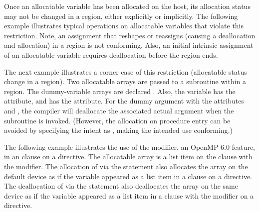 \begin{fortranspecific}[4ex]

Once an allocatable variable has been allocated on the host,
its allocation status may not be changed in a  region, either
explicitly or implicitly. The following example illustrates typical
operations on allocatable variables that violate this restriction.
Note, an assignment that reshapes or reassigns (causing a deallocation
and allocation) in a  region is not conforming.
Also, an initial intrinsic assignment of an allocatable variable 
requires deallocation before the  region ends.


The next example illustrates a corner case of this restriction (allocatable status
change in a  region).
Two allocatable arrays are passed to a subroutine within a 
region. The dummy-variable arrays are declared .
Also, the  variable has the  attribute, and 
has the  attribute. 
For the dummy argument with the attributes  and , 
the compiler will deallocate the associated actual argument when the subroutine is invoked. 
(However, the allocation on procedure entry can be avoided by specifying the intent 
as , making the intended use conforming.)


The following example illustrates the use of the 
modifier, an OpenMP 6.0 feature, in an  clause on 
a  directive.
The allocatable array  is a list item on the  clause 
with the  modifier.
The allocation of  via the  statement also allocates
the array on the default device as if the variable appeared as a list item 
in a  clause on a  directive.
The deallocation of  via the  statement also 
deallocates the array on the same device as if the variable appeared as 
a list item in a  clause with the  modifier on 
a  directive.


\end{fortranspecific}
